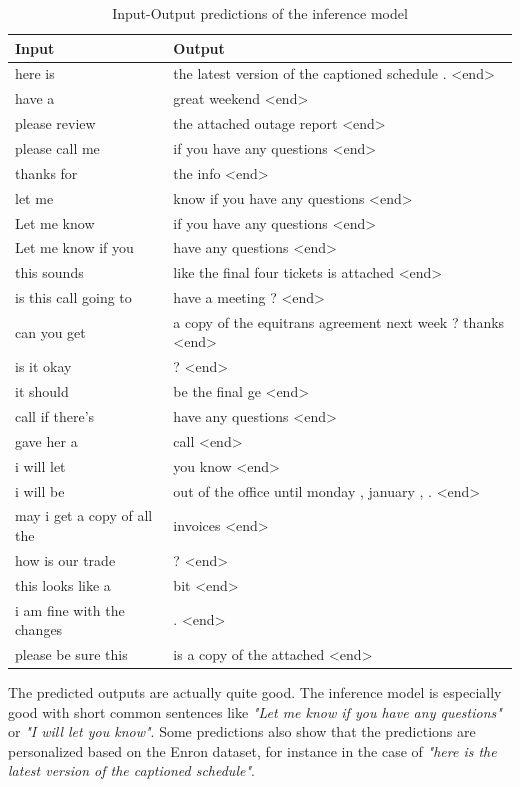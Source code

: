 \documentclass{article}
\begin{document}
\begin{table}[!htbp]
   \centering
   \begin{tabular}{ll}
     \toprule
     Input & Output \\
     \midrule
     here is & the latest version of the captioned schedule . <end> \\
     have a & great weekend <end> \\
     please review & the attached outage report <end> \\
     please call me & if you have any questions <end> \\
     thanks for & the info <end> \\
     let me & know if you have any questions <end> \\
     Let me know & if you have any questions <end> \\
     Let me know if you & have any questions <end> \\
     this sounds & like the final four tickets is attached <end> \\
     is this call going to & have a meeting ? <end> \\
     can you get & a copy of the equitrans agreement next week ? thanks <end> \\
     is it okay & ? <end> \\
     it should & be the final ge <end> \\
     call if there's & have any questions <end> \\
     gave her a & call <end> \\
     i will let & you know <end> \\
     i will be & out of the office until monday , january , . <end> \\
     may i get a copy of all the & invoices <end> \\
     how is our trade & ? <end> \\
     this looks like a & bit <end> \\
     i am fine with the changes & . <end> \\
     please be sure this & is a copy of the attached <end> \\
     \bottomrule
   \end{tabular}
   \caption{Input-Output predictions of the inference model}
\end{table}

The predicted outputs are actually quite good. The inference model is especially good with short common sentences like \textit{"Let me know if you have any questions"} or \textit{"I will let you know"}. Some predictions also show that the predictions are personalized based on the Enron dataset, for instance in the case of \textit{"here is the latest version of the captioned schedule"}.
\end{document}

